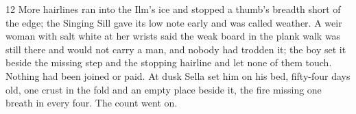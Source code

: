 \begin{CRchronicle}{12}
More hairlines ran into the Ilm’s ice and stopped a thumb’s breadth short of the edge; the Singing Sill gave its low note early and was called weather. A weir woman with salt white at her wrists said the weak board in the plank walk was still there and would not carry a man, and nobody had trodden it; the boy set it beside the missing step and the stopping hairline and let none of them touch. Nothing had been joined or paid. At dusk Sella set him on his bed, fifty-four days old, one crust in the fold and an empty place beside it, the fire missing one breath in every four. The count went on.
\end{CRchronicle}
